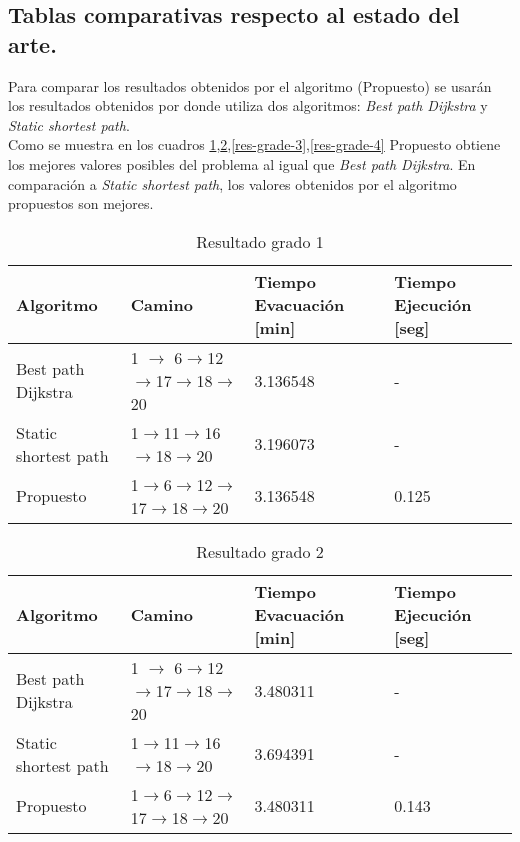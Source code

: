 \subsection{Tablas comparativas respecto al estado del arte.}

Para comparar los resultados obtenidos por el algoritmo (Propuesto) se usarán los resultados obtenidos por  \cite{Yuan20091081} donde utiliza dos algoritmos: \textit{Best path Dijkstra} y \textit{Static shortest path}. \\

Como se muestra en los cuadros \ref{res-grade-1},\ref{res-grade-2},\ref{res-grade-3},\ref{res-grade-4} Propuesto obtiene los mejores valores posibles del problema al igual que \textit{Best path Dijkstra}. En comparación a \textit{Static shortest path}, los valores obtenidos por el algoritmo propuestos son mejores.
\begin{table}[H]
\centering
\begin{tabular}{|l|l|l|l|}
\hline
Algoritmo            & Camino           & Tiempo Evacuación {[}min{]} & Tiempo Ejecución {[}seg{]}\\ \hline
Best path Dijkstra   & 1 $\rightarrow$ 6$\rightarrow$12$\rightarrow$17$\rightarrow$18$\rightarrow$20 & 3.136548  & -       \\ \hline
Static shortest path & 1$\rightarrow$11$\rightarrow$16$\rightarrow$18$\rightarrow$20    & 3.196073   & -      \\ \hline
Propuesto              & 1$\rightarrow$6$\rightarrow$12$\rightarrow$17$\rightarrow$18$\rightarrow$20 & 3.136548 & 0.125        \\ \hline
\end{tabular}
\caption{Resultado grado 1}
\label{res-grade-1}
\end{table}

\begin{table}[H]
\centering
\begin{tabular}{|l|l|l|l|}
\hline
Algoritmo            & Camino           & Tiempo Evacuación {[}min{]} & Tiempo Ejecución {[}seg{]}\\ \hline
Best path Dijkstra   & 1 $\rightarrow$ 6$\rightarrow$12$\rightarrow$17$\rightarrow$18$\rightarrow$20 & 3.480311  & -       \\ \hline
Static shortest path & 1$\rightarrow$11$\rightarrow$16$\rightarrow$18$\rightarrow$20    & 3.694391  & -       \\ \hline
Propuesto              & 1$\rightarrow$6$\rightarrow$12$\rightarrow$17$\rightarrow$18$\rightarrow$20 & 3.480311  & 0.143       \\ \hline
\end{tabular}
\caption{Resultado grado 2}
\label{res-grade-2}
\end{table}

